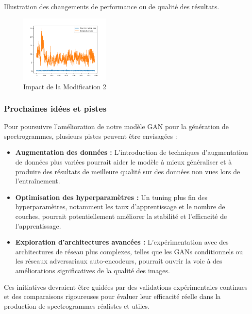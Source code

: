 Illustration des changements de performance ou de qualité des résultats.
\begin{figure}[H]
    \centering
    \includegraphics[width=0.4\textwidth]{logos/loss.png}
    \caption{Impact de la Modification 2}
    \label{fig:mod2}
\end{figure}

\subsubsection{Prochaines idées et pistes}
Pour poursuivre l'amélioration de notre modèle GAN pour la génération de spectrogrammes, plusieurs pistes peuvent être envisagées :

\begin{itemize}
    \item \textbf{Augmentation des données :} L'introduction de techniques d'augmentation de données plus variées pourrait aider le modèle à mieux généraliser et à produire des résultats de meilleure qualité sur des données non vues lors de l'entraînement.
    \item \textbf{Optimisation des hyperparamètres :} Un tuning plus fin des hyperparamètres, notamment les taux d'apprentissage et le nombre de couches, pourrait potentiellement améliorer la stabilité et l'efficacité de l'apprentissage.
    \item \textbf{Exploration d'architectures avancées :} L'expérimentation avec des architectures de réseau plus complexes, telles que les GANs conditionnels ou les réseaux adversariaux auto-encodeurs, pourrait ouvrir la voie à des améliorations significatives de la qualité des images.
\end{itemize}

Ces initiatives devraient être guidées par des validations expérimentales continues et des comparaisons rigoureuses pour évaluer leur efficacité réelle dans la production de spectrogrammes réalistes et utiles.
